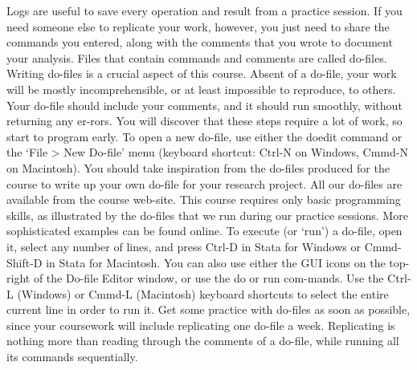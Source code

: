 \begin{description}

Logs are useful to save every operation and result from a practice session. If you need someone else to replicate your work, however, you just need to share the commands you entered, along with the comments that you wrote to document your analysis. Files that contain commands and comments are called do-files.
Writing do-files is a crucial aspect of this course. Absent of a do-file, your work will be mostly incomprehensible, or at least impossible to reproduce, to others. Your do-file should include your comments, and it should run smoothly, without returning any er-rors. You will discover that these steps require a lot of work, so start to program early. To open a new do-file, use either the doedit command or the ‘File > New Do-file’ menu (keyboard shortcut: Ctrl-N on Windows, Cmmd-N on Macintosh).
You should take inspiration from the do-files produced for the course to write up your own do-file for your research project. All our do-files are available from the course web-site. This course requires only basic programming skills, as illustrated by the do-files that we run during our practice sessions. More sophisticated examples can be found online.
To execute (or ‘run’) a do-file, open it, select any number of lines, and press Ctrl-D in Stata for Windows or Cmmd-Shift-D in Stata for Macintosh. You can also use either the GUI icons on the top-right of the Do-file Editor window, or use the do or run com-mands. Use the Ctrl-L (Windows) or Cmmd-L (Macintosh) keyboard shortcuts to select the entire current line in order to run it.
Get some practice with do-files as soon as possible, since your coursework will include replicating one do-file a week. Replicating is nothing more than reading through the comments of a do-file, while running all its commands sequentially.

\end{description}

